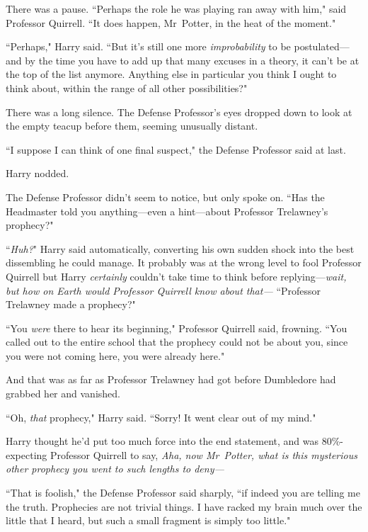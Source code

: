 There was a pause. ``Perhaps the role he was playing ran away with him," said Professor Quirrell. ``It does happen, Mr~Potter, in the heat of the moment."

``Perhaps," Harry said. ``But it's still one more \emph{improbability} to be postulated—and by the time you have to add up that many excuses in a theory, it can't be at the top of the list anymore. Anything else in particular you think I ought to think about, within the range of all other possibilities?"

There was a long silence. The Defense Professor's eyes dropped down to look at the empty teacup before them, seeming unusually distant.

``I suppose I can think of one final suspect," the Defense Professor said at last.

Harry nodded.

The Defense Professor didn't seem to notice, but only spoke on. ``Has the Headmaster told you anything—even a hint—about Professor Trelawney's prophecy?"

``\emph{Huh?}" Harry said automatically, converting his own sudden shock into the best dissembling he could manage. It probably was at the wrong level to fool Professor Quirrell but Harry \emph{certainly} couldn't take time to think before replying—\emph{wait, but how on Earth would Professor Quirrell know about \emph{that}—} ``Professor Trelawney made a prophecy?"

``You \emph{were} there to hear its beginning," Professor Quirrell said, frowning. ``You called out to the entire school that the prophecy could not be about you, since you were not coming here, you were already here."


And that was as far as Professor Trelawney had got before Dumbledore had grabbed her and vanished.

``Oh, \emph{that} prophecy," Harry said. ``Sorry! It went clear out of my mind."

Harry thought he'd put too much force into the end statement, and was 80\%-expecting Professor Quirrell to say, \emph{Aha, now Mr~Potter, what is this mysterious \emph{other} prophecy you went to such lengths to deny—}

``That is foolish," the Defense Professor said sharply, ``if indeed you are telling me the truth. Prophecies are not trivial things. I have racked my brain much over the little that I heard, but such a small fragment is simply too little."


